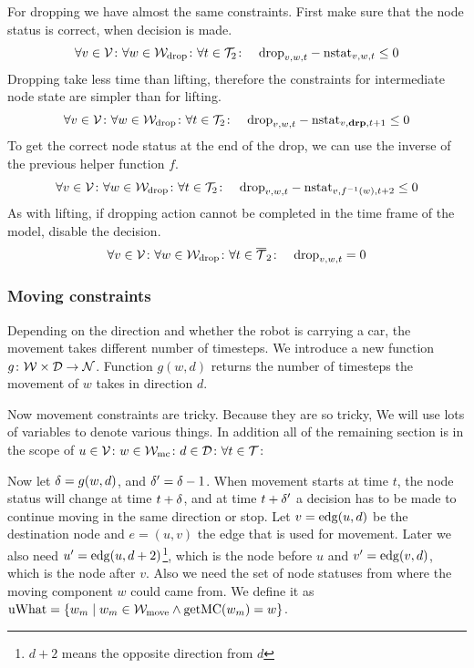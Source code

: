 For dropping we have almost the same constraints. First make sure that the node
status is correct, when decision is made.
\begin{align}
    &\forall v \in \mathcal{V} \colon \forall w \in \mathcal{W}_\mathrm{drop} \colon \forall t \in \mathcal{T}_2 \colon
    &\mathrm{drop}_{v,w,t} - \mathrm{nstat}_{v,w,t} \leq 0
\end{align}
Dropping take less time than lifting, therefore the constraints for
intermediate node state are simpler than for lifting.
\begin{align}
    &\forall v \in \mathcal{V} \colon \forall w \in \mathcal{W}_\mathrm{drop} \colon \forall t \in \mathcal{T}_2 \colon
    &\mathrm{drop}_{v,w,t} - \mathrm{nstat}_{v,\text{\bf drp},t+1} \leq 0
\end{align}
To get the correct node status at the end of the drop, we can use the inverse
of the previous helper function $f$.
\begin{align}
    &\forall v \in \mathcal{V} \colon \forall w \in \mathcal{W}_\mathrm{drop} \colon \forall t \in \mathcal{T}_2 \colon
    &\mathrm{drop}_{v,w,t} - \mathrm{nstat}_{v,f^{-1}(w),t+2} \leq 0
\end{align}
As with lifting, if dropping action cannot be completed in the time frame of
the model, disable the decision.
\begin{align}
    &\forall v \in \mathcal{V} \colon \forall w \in \mathcal{W}_\mathrm{drop} \colon \forall t \in \overline{\mathcal{T}}_2
    \colon &\mathrm{drop}_{v,w,t} = 0
\end{align}

\subsubsection{Moving constraints}
Depending on the direction and whether the robot is carrying a car, the
movement takes different number of timesteps. We introduce a new function $g
\colon \mathcal{W} \times \mathcal{D} \to \mathcal{N}$. Function $g(w,d)$ returns the number of
timesteps the movement of $w$ takes in direction $d$. 

Now movement constraints are tricky. Because they are so tricky, We will use
lots of variables to denote various things. In addition all of the remaining
section is in the scope of $u \in \mathcal{V} \colon w \in \mathcal{W}_\mathrm{mc} \colon d \in \mathcal{D} \colon
\forall t \in \mathcal{T} \colon$

Now let $\delta = g(w,d)$, and $\delta' = \delta-1$. When movement starts at time $t$,
the node status will change at time $t+\delta$, and at time $t+\delta'$ a decision
has to be made to continue moving in the same direction or stop. Let $v =
\mathrm{edg}(u,d)$ be the destination node and $e = (u,v)$ the edge that is used for
movement. Later we also need $u' = \mathrm{edg}(u,d+2)$\footnote{$d+2$ means the
opposite direction from $d$}, which is the node before $u$ and $v' =
\mathrm{edg}(v,d)$, which is the node after $v$. Also we need the set of node statuses
from where the moving component $w$ could came from. We define it as
$\mathrm{uWhat} = \{w_m \mid w_m \in \mathcal{W}_\mathrm{move} \wedge \mathrm{getMC}(w_m) = w\}$.

